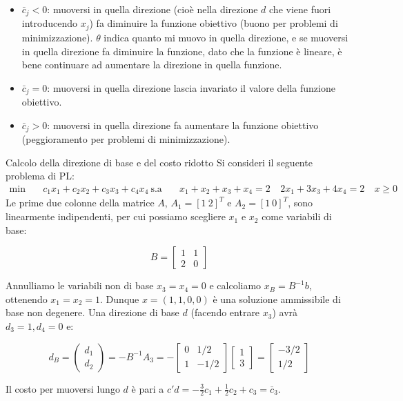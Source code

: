 \begin{itemize}
    \item \(\bar c_j<0\): muoversi in quella direzione (cioè nella direzione $d$ che viene fuori introducendo $x_j$) fa diminuire la funzione obiettivo (buono per problemi di minimizzazione).
    $\theta$ indica quanto mi muovo in quella direzione, e se muoversi in quella direzione fa diminuire la funzione, dato che la funzione è lineare, è bene continuare ad aumentare la direzione in quella funzione.

    \item \(\bar c_j=0\): muoversi in quella direzione lascia invariato il valore della funzione obiettivo.

    \item \(\bar c_j>0\): muoversi in quella direzione fa aumentare la funzione obiettivo (peggioramento per problemi di minimizzazione).
\end{itemize}


\begin{example}{Calcolo della direzione di base e del costo ridotto}
Si consideri il seguente problema di PL:
\begin{align*}
\min \quad & c_1 x_1 + c_2 x_2 + c_3 x_3 + c_4 x_4 \
\text{s.a} \quad & x_1 + x_2 + x_3 + x_4 = 2 \
& 2x_1 + 3x_3 + 4x_4 = 2 \
& x \ge 0
\end{align*}
Le prime due colonne della matrice $A$, $A_1 = [1 \ 2]^T$ e $A_2 = [1 \ 0]^T$, sono linearmente indipendenti, per cui possiamo scegliere $x_1$ e $x_2$ come variabili di base:


$$B = \begin{bmatrix} 1 & 1 \\ 2 & 0 \end{bmatrix}$$


Annulliamo le variabili non di base $x_3 = x_4 = 0$ e calcoliamo $x_B = B^{-1}b$, ottenendo $x_1 = x_2 = 1$. Dunque $x = (1, 1, 0, 0)$ è una soluzione ammissibile di base non degenere. Una direzione di base $d$ (facendo entrare $x_3$) avrà $d_3 = 1, d_4 = 0$ e:


$$d_B = \begin{pmatrix} d_1 \\ d_2 \end{pmatrix} = -B^{-1} A_3 = -\begin{bmatrix} 0 & 1/2 \\ 1 & -1/2 \end{bmatrix} \begin{bmatrix} 1 \\ 3 \end{bmatrix} = \begin{bmatrix} -3/2 \\ 1/2 \end{bmatrix}$$


Il costo per muoversi lungo $d$ è pari a $c'd = -\frac{3}{2}c_1 + \frac{1}{2}c_2 + c_3 = \bar{c}_3$.
\end{example}

